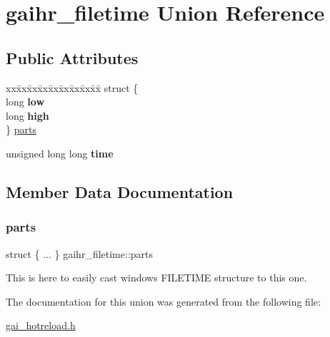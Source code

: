 \hypertarget{uniongaihr__filetime}{}\section{gaihr\+\_\+filetime Union Reference}
\label{uniongaihr__filetime}
\subsection*{Public Attributes}
\begin{DoxyCompactItemize}
\item 
\begin{tabbing}
xx\=xx\=xx\=xx\=xx\=xx\=xx\=xx\=xx\=\kill
struct \{\\
\>long {\bfseries low}\\
\>long {\bfseries high}\\
\} \hyperlink{uniongaihr__filetime_a61446b486ff5dbcd62b9b83418d853ac}{parts}\\

\end{tabbing}\item 
\mbox{\label{uniongaihr__filetime_a17c62c2a56dc2b6f8ad20c3359562b2e}} 
unsigned long long {\bfseries time}
\end{DoxyCompactItemize}


\subsection{Member Data Documentation}
\mbox{\label{uniongaihr__filetime_a61446b486ff5dbcd62b9b83418d853ac}} 
\subsubsection{\texorpdfstring{parts}{parts}}
{\footnotesize\ttfamily struct \{ ... \}   gaihr\+\_\+filetime\+::parts}

This is here to easily cast windows F\+I\+L\+E\+T\+I\+ME structure to this one. 

The documentation for this union was generated from the following file\+:\begin{DoxyCompactItemize}
\item 
\hyperlink{gai__hotreload_8h}{gai\+\_\+hotreload.\+h}\end{DoxyCompactItemize}
